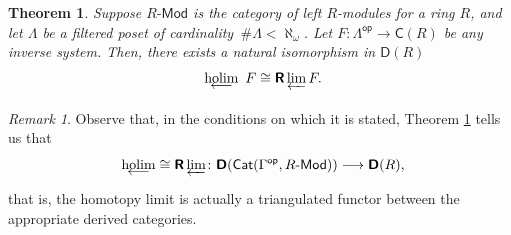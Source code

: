 \documentclass[reqno,11pt]{amsart}
\theoremstyle{plain}
\newtheorem{thm}{Theorem}[section]
\theoremstyle{remark}
\newtheorem*{rem}{Remark}
\theoremstyle{definition}
\numberwithin{equation}{thm}
\newcommand{\CCC}{\boldsymbol{\mathsf{C}}}
\newcommand{\D}{\boldsymbol{\mathsf{D}}}
\newcommand{\R}{\boldsymbol{\mathsf{R}}}
\newcommand{\holim}[1]{\begin{array}[t]{c} {\rm holim}\\[-7.5 pt]
		{\longleftarrow} \end{array}}
\newcommand{\lto}{\longrightarrow}
\newcommand{\md}{\text{-}\mathsf{Mod}}
\newcommand{\op}{\mathsf{op}}
\DeclareMathOperator{\cat}{\mathsf{Cat}}
\begin{document}
	\begin{thm}\label{thm:in-rmod-holim-is-rlim}
		Suppose $R\md$ is the category of left $R$-modules for a ring $R$, and let $\Lambda$ be a filtered poset of cardinality \,$\#\Lambda < \aleph_\omega$. Let $F \colon \Lambda^\op \to \CCC(R)$ be \emph{any} inverse system. Then, there exists a natural isomorphism in $\D(R)$ 
		\[
			\holim{} F \cong \R\varprojlim F.
		\]
	\end{thm}
	
	\begin{rem}
		Observe that, in the conditions on which it is stated, Theorem \ref{thm:in-rmod-holim-is-rlim} tells us that
		\[
			\holim{} \!\!\!\cong \R\varprojlim \colon \D(\cat(\Gamma^\op, R\md)) \lto \D(R),
		\]
		that is, the homotopy limit is actually a triangulated functor between the appropriate derived categories.
	\end{rem}
\end{document}
